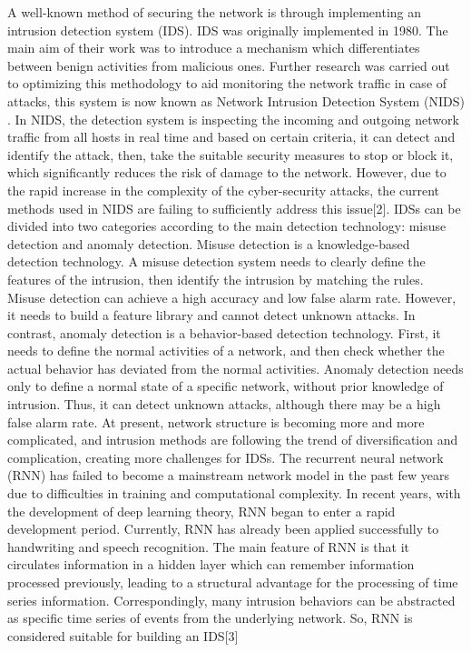 A well-known method of securing the network is through implementing an intrusion detection system (IDS). IDS was originally implemented in 1980. The main aim of their work was to introduce a mechanism which differentiates between benign activities from malicious ones. Further research was carried out to optimizing this methodology to aid monitoring the network traffic in case of attacks, this system is now known as Network Intrusion Detection System (NIDS) . In NIDS, the detection system is inspecting the incoming and outgoing network traffic from all hosts in real time and based on certain criteria, it can detect and identify the attack, then, take the suitable security measures to stop or block it, which significantly reduces the risk of damage to the network. However, due to the rapid increase in the complexity of the cyber-security attacks, the current methods used in NIDS are failing to sufficiently address this issue[2].%
IDSs can be divided into two categories according to the main detection technology: misuse detection and anomaly detection. Misuse detection is a knowledge-based detection technology. A misuse detection system needs to clearly define the features of the intrusion, then identify the intrusion by matching the rules. Misuse detection can achieve a high accuracy and low false alarm rate. However, it needs to build a feature library and cannot detect unknown attacks. In contrast, anomaly detection is a behavior-based detection technology. First, it needs to define the normal activities of a network, and then check whether the actual behavior has deviated from the normal activities. Anomaly detection needs only to define a normal state of a specific network, without prior knowledge of intrusion. Thus, it can detect unknown attacks, although there may be a high false alarm rate. At present, network structure is becoming more and more complicated, and intrusion methods are following the trend of diversification and complication, creating more challenges for IDSs.
The recurrent neural network (RNN) has failed to become a mainstream network model in the past few years due to difficulties in training and computational complexity. In recent years, with the development of deep learning theory, RNN began to enter a rapid development period. Currently, RNN has already been applied successfully to handwriting and speech recognition. The main feature of RNN is that it circulates information in a hidden layer which can remember information processed previously, leading to a structural advantage for the processing of time series information. Correspondingly, many intrusion behaviors can be abstracted as specific time series of events from the underlying network. So, RNN is considered suitable for building an IDS[3]%
